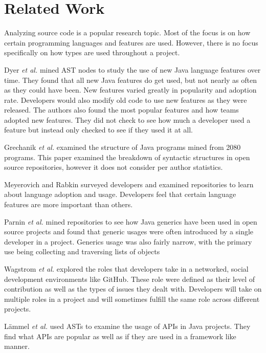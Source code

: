 \documentclass[conference]{IEEEtran}
\begin{document}
\section{Related Work}

Analyzing source code is a popular research topic. Most of the focus is on how certain programming languages and features are used. However, there is no focus specifically on how types are used throughout a project.

Dyer \textit{et al.} \cite{Dyer:2014:MBA:2568225.2568295} mined AST nodes to study the use of new Java language features over time. They found that all new Java features do get used, but not nearly as often as they could have been. New features varied greatly in popularity and adoption rate. Developers would also modify old code to use new features as they were released. The authors also found the most popular features and how teams adopted new features. They did not check to see how much a developer used a feature but instead only checked to see if they used it at all.

Grechanik \textit{et al.} \cite{Grechanik:2010:EIL:1852786.1852801} examined the structure of Java programs mined from 2080 programs. This paper examined the breakdown of syntactic structures in open source repositories, however it does not consider per author statistics. 

Meyerovich and Rabkin \cite{Meyerovich:2013:EAP:2509136.2509515} surveyed developers and examined repositories to learn about language adoption and usage. Developers feel that certain language features are more important than others.

Parnin \textit{et al.} \cite{Parnin:2011:JGA:1985441.1985446} mined repositories to see how Java generics have been used in open source projects and found that generic usages were often introduced by a single developer in a project. Generics usage was also fairly narrow, with the primary use being collecting and traversing lists of objects

Wagstrom \textit{et al.} \cite{Patrick:Wagstrom:2012} explored the roles that developers take in a networked, social development environments like GitHub. These role were defined as their level of contribution as well as the types of issues they dealt with. Developers will take on multiple roles in a project and will sometimes fulfill the same role across different projects.

L\"{a}mmel \textit{et al.} \cite{Lammel:2011:LAA:1982185.1982471} used ASTs to examine the usage of APIs in Java projects. They find what APIs are popular as well as if they are used in a framework like manner.
\end{document}
